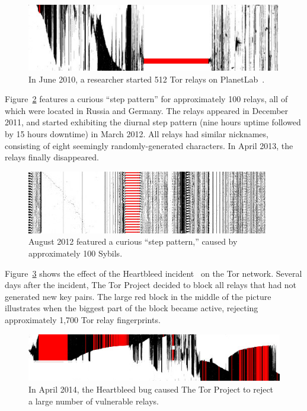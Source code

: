 \begin{figure}[t]
	\centering
	\includegraphics[width=\linewidth]{diagrams/2010-06.jpg}
	\caption{In June 2010, a researcher started 512 Tor relays on
		PlanetLab~\cite{progressreport}.}
	\label{fig:2010-06-planetlab}
\end{figure}

Figure~\ref{fig:2012-08-steppattern} features a curious ``step pattern'' for
approximately 100 relays, all of which were located in Russia and Germany.  The
relays appeared in December 2011, and started exhibiting the diurnal step
pattern (nine hours uptime followed by 15 hours downtime) in March 2012.  All
relays had similar nicknames, consisting of eight seemingly randomly-generated
characters.  In April 2013, the relays finally disappeared.

\begin{figure}[t]
	\centering
	\includegraphics[width=\linewidth]{diagrams/2012-08.jpg}
	\caption{August 2012 featured a curious ``step pattern,'' caused by
	approximately 100 Sybils.}
	\label{fig:2012-08-steppattern}
\end{figure}

Figure~\ref{fig:2014-04-heartbleed} shows the effect of the Heartbleed
incident~\cite{Durumeric2014a} on the Tor network.  Several days after the
incident, The Tor Project decided to block all relays that had not generated new
key pairs.  The large red block in the middle of the picture illustrates when
the biggest part of the block became active, rejecting approximately 1,700 Tor
relay fingerprints.

\begin{figure}[t]
	\centering
	\includegraphics[width=\linewidth]{diagrams/2014-04.jpg}
	\caption{In April 2014, the Heartbleed bug caused The Tor Project to reject
	a large number of vulnerable relays.}
	\label{fig:2014-04-heartbleed}
\end{figure}

